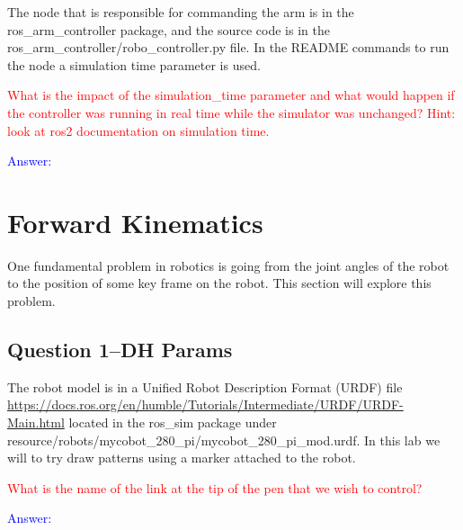 \documentclass[11pt,a4paper]{article}
\begin{document}
The node that is responsible for commanding the arm is in the ros\_arm\_controller package, and the source code is in the ros\_arm\_controller/robo\_controller.py file. In the README commands to run the node a simulation time parameter is used.

\textcolor{red}{ What is the impact of the simulation\_time parameter and what would happen if the controller was running in real time while the simulator was unchanged? Hint: look at ros2 documentation on simulation time.}

\textcolor{blue}{Answer: }

\clearpage

\section{Forward Kinematics}

One fundamental problem in robotics is going from the joint angles of the robot to the position of some key frame on the robot. This section will explore this problem.

\subsection{Question 1--DH Params}

The robot model is in a Unified Robot Description Format (URDF) file \url{https://docs.ros.org/en/humble/Tutorials/Intermediate/URDF/URDF-Main.html} located in the ros\_sim package under resource/robots/mycobot\_280\_pi/mycobot\_280\_pi\_mod.urdf. In this lab we will to try draw patterns using a marker attached to the robot.

\textcolor{red}{ What is the name of the link at the tip of the pen that we wish to control? }

\textcolor{blue}{Answer: }
\end{document}
